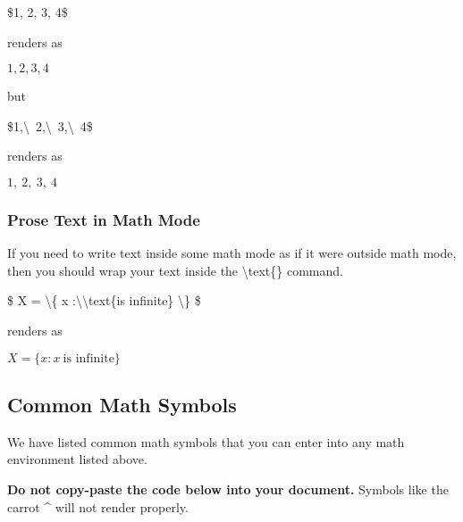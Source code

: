 \documentclass[11pt,onecolumn]{article}
\theoremstyle{definition}
\begin{document}
\begin{tcolorbox}
\$1, 2, 3, 4\$
\end{tcolorbox}

renders as

$1, 2, 3, 4$

but

\begin{tcolorbox}
\$1,\textbackslash\ 2,\textbackslash\ 3,\textbackslash\ 4\$
\end{tcolorbox}

renders as 

$1,\ 2,\ 3,\ 4$

\subsubsection{Prose Text in Math Mode}

If you need to write text inside some math mode as if it were outside math mode, then you should wrap your text inside the \textbackslash text\{\} command.

\begin{tcolorbox}
\$
X = \textbackslash \{ x :\textbackslash \textbackslash text\{is infinite\} \textbackslash\}
\$
\end{tcolorbox}

renders as

$
X = \{x : x\ \text{is infinite}\}
$

\subsection{Common Math Symbols}

We have listed common math symbols that you can enter into any math environment listed above.

\textbf{Do not copy-paste the code below into your document.} Symbols like the carrot \textrm{\^} will not render properly. 
\end{document}
